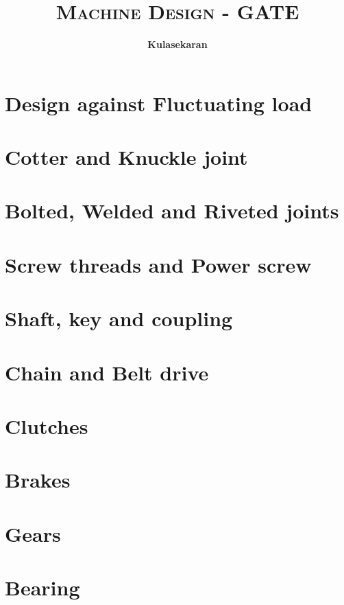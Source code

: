 \documentclass[8pt]{report}
\title{\Huge{\textsc{Machine Design - GATE}}}
\author{\huge{\textbf{Kulasekaran}}}
\begin{document}
\maketitle
\tableofcontents
\chapter{Design against Fluctuating load}
\chapter{Cotter and Knuckle joint}
\chapter{Bolted, Welded and Riveted joints}
\chapter{Screw threads and Power screw}
\chapter{Shaft, key and coupling}
\chapter{Chain and Belt drive}
\chapter{Clutches}
\chapter{Brakes}
\chapter{Gears}
\chapter{Bearing}
\end{document}

